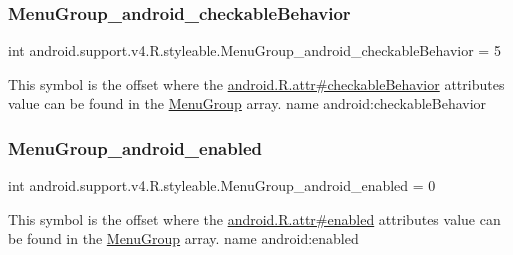 \subsubsection{\texorpdfstring{Menu\+Group\+\_\+android\+\_\+checkable\+Behavior}{MenuGroup\_android\_checkableBehavior}}
{\footnotesize\ttfamily int android.\+support.\+v4.\+R.\+styleable.\+Menu\+Group\+\_\+android\+\_\+checkable\+Behavior = 5\hspace{0.3cm}{\ttfamily [static]}}

This symbol is the offset where the \hyperlink{}{android.\+R.\+attr\#checkable\+Behavior} attribute\textquotesingle{}s value can be found in the \hyperlink{classandroid_1_1support_1_1v4_1_1R_1_1styleable_a83610c6b8679a40b3508815b6fd56980}{Menu\+Group} array.  name android\+:checkable\+Behavior \mbox{\label{classandroid_1_1support_1_1v4_1_1R_1_1styleable_a0ef41259de1dde6c511a4b586a9a393d}} 
\subsubsection{\texorpdfstring{Menu\+Group\+\_\+android\+\_\+enabled}{MenuGroup\_android\_enabled}}
{\footnotesize\ttfamily int android.\+support.\+v4.\+R.\+styleable.\+Menu\+Group\+\_\+android\+\_\+enabled = 0\hspace{0.3cm}{\ttfamily [static]}}

This symbol is the offset where the \hyperlink{}{android.\+R.\+attr\#enabled} attribute\textquotesingle{}s value can be found in the \hyperlink{classandroid_1_1support_1_1v4_1_1R_1_1styleable_a83610c6b8679a40b3508815b6fd56980}{Menu\+Group} array.  name android\+:enabled \mbox{\label{classandroid_1_1support_1_1v4_1_1R_1_1styleable_a4991b9572aa5383361a4a0898b840fb6}} 
